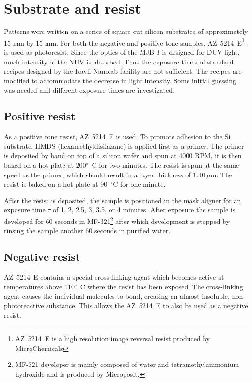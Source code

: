 \section*{Substrate and resist}
Patterns were written on a series of square cut silicon substrates of approximately 15 mm by 15 mm. For both the negative and positive tone samples, AZ~5214~E\footnote{AZ~5214~E is a high resolution image reversal resist produced by MicroChemicals} is used as photoresist. Since the optics of the MJB-3 is designed for DUV light, much intensity of the NUV is absorbed. Thus the exposure times of standard recipes designed by the Kavli Nanolab facility are not sufficient. The recipes are modified to accommodate the decrease in light intensity. Some initial guessing was needed and different exposure times are  investigated.


\subsection*{Positive resist}
As a positive tone resist, AZ~5214~E is used. To promote adhesion to the Si substrate, HMDS (hexamethyldisilazane) is applied first as a primer. The primer is deposited by hand on top of a silicon wafer and spun at 4000 RPM, it is then baked on a hot plate at 200$^{\circ}$~C for two minutes. The resist is spun at the same speed as the primer, which should result in a layer thickness of $1.40~\mu$m. The resist is baked on a hot plate at 90~$^{\circ}$C for one minute.

After the resist is deposited, the sample is positioned in the mask aligner for an exposure time $\tau$ of 1, 2, 2.5, 3, 3.5, or 4 minutes. After exposure the sample is developed for 60 seconds in MF-321\footnote{MF-321 developer is mainly composed of water and tetramethylammonium hydroxide and is produced by Microposit.} after which development is stopped by rinsing the sample another 60 seconds in purified water.

\subsection*{Negative resist}
AZ~5214~E contains a special cross-linking agent which becomes active at temperatures above 110$^{\circ}$~C where the resist has been exposed. The cross-linking agent causes the individual molecules to bond, creating an almost insoluble, non-photoreactive substance. This allows the AZ~5214~E to also be used as a negative resist.

